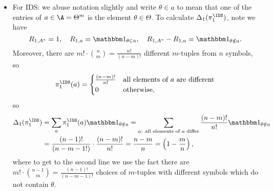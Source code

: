 \documentclass[11pt, openany]{book}
\begin{document}
\begin{example}
\begin{itemize}
\begin{itemize}
                    \item For IDS: we abuse notation slightly and write $\theta\in a$ to mean that one of the entries of $a\in\A = \Theta^m$ is the element $\theta\in\Theta$. To calculate $\Delta_1(\pi_1^{\IDS})$, note we have
                        \[
                            R_{1,A^*} = 1, \quad R_{1,a} = \ind_{\theta\in a}, \quad R_{1,A^*} - R_{1,a} = \ind_{\theta\notin a}.
                        \]
                        Moreover, there are $m! \cdot \binom{n}{m} = \frac{n!}{(n-m)!}$ different $m$-tuples from $n$ symbols, so
                        \[
                            \pi_1^{\IDS}(a) = \begin{cases}
                                \frac{(n-m)!}{n!} & \text{all elements of $a$ are different} \\
                                0 & \text{otherwise},
                            \end{cases}
                        \]
                        so
                        \begin{align*}
                            \Delta_1(\pi_1^{\IDS}) & = \sum_a \pi_1^{\IDS}(a) \ind_{\theta\notin a} = \sum_{\text{$a$: all elements of $a$ differ}} \frac{(n-m)!}{n!} \ind_{\theta\notin a} \\
                                                   & = \frac{(n-1)!}{(n-m-1!)}\cdot\frac{(n-m)!}{n!} = \frac{n-m}{n} = \left(1-\frac{m}{n}\right),
                        \end{align*}
                        where to get to the second line we use the fact there are $m!\cdot\binom{n-1}{m} = \frac{(n-1)!}{(n-m-1)!}$ choices of $m$-tuples with different symbols which do not contain $\theta$.


\end{itemize}
\end{itemize}
\end{example}
\end{document}
